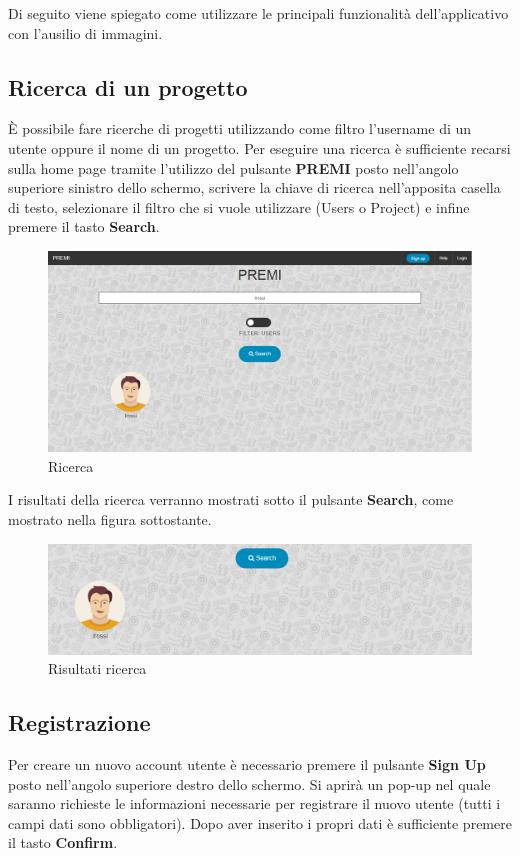 Di seguito viene spiegato come utilizzare le principali funzionalità dell'applicativo con l'ausilio di immagini.

\subsection{Ricerca di un progetto}

È possibile fare ricerche di progetti utilizzando come filtro l'username di un utente oppure il nome di un progetto.
\newline
Per eseguire una ricerca è sufficiente recarsi sulla home page tramite l'utilizzo del pulsante \textbf{PREMI} posto nell'angolo superiore sinistro dello schermo, scrivere la chiave di ricerca nell'apposita casella di testo, selezionare il filtro che si vuole utilizzare (Users o Project) e infine premere il tasto \textbf{Search}.

\begin{figure}[h] 
	\centering 
	\includegraphics[scale=0.40] {img/ricerca.png}
	\caption{Ricerca} 
\end{figure}


\noindent I risultati della ricerca verranno mostrati sotto il pulsante \textbf{Search}, come mostrato nella figura sottostante.

\begin{figure}[h] 
	\centering 
	\includegraphics[scale=0.40] {img/ricercaris.png}
	\caption{Risultati ricerca} 
\end{figure}

\newpage
\subsection{Registrazione}
Per creare un nuovo account utente è necessario premere il pulsante \textbf{Sign Up} posto nell'angolo superiore destro dello schermo. Si aprirà un pop-up nel quale saranno richieste le informazioni necessarie per registrare il nuovo utente (tutti i campi dati sono obbligatori). Dopo aver inserito i propri dati è sufficiente premere il tasto \textbf{Confirm}.

